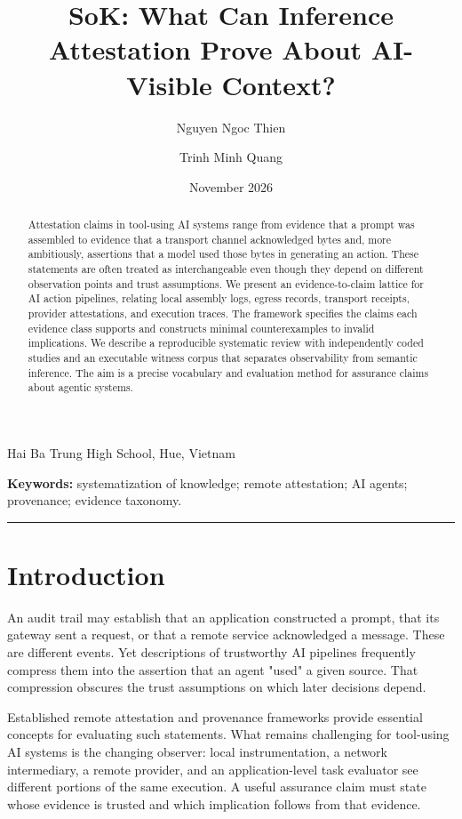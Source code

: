 \documentclass[11pt,a4paper]{article}
\title{\vspace{-1em}\textbf{SoK: What Can Inference Attestation Prove About AI-Visible Context?}}
\author{Nguyen Ngoc Thien \and Trinh Minh Quang}\date{November 2026}
\begin{document}
\maketitle
\begin{center}\small Hai Ba Trung High School, Hue, Vietnam\end{center}
\begin{abstract}
Attestation claims in tool-using AI systems range from evidence that a prompt was assembled to evidence that a transport channel acknowledged bytes and, more ambitiously, assertions that a model used those bytes in generating an action. These statements are often treated as interchangeable even though they depend on different observation points and trust assumptions. We present an evidence-to-claim lattice for AI action pipelines, relating local assembly logs, egress records, transport receipts, provider attestations, and execution traces. The framework specifies the claims each evidence class supports and constructs minimal counterexamples to invalid implications. We describe a reproducible systematic review with independently coded studies and an executable witness corpus that separates observability from semantic inference. The aim is a precise vocabulary and evaluation method for assurance claims about agentic systems.
\end{abstract}
\noindent\textbf{Keywords:} systematization of knowledge; remote attestation; AI agents; provenance; evidence taxonomy.
\medskip\hrule\medskip

\section{Introduction}
An audit trail may establish that an application constructed a prompt, that its gateway sent a request, or that a remote service acknowledged a message. These are different events. Yet descriptions of trustworthy AI pipelines frequently compress them into the assertion that an agent "used" a given source. That compression obscures the trust assumptions on which later decisions depend.

Established remote attestation and provenance frameworks provide essential concepts for evaluating such statements. What remains challenging for tool-using AI systems is the changing observer: local instrumentation, a network intermediary, a remote provider, and an application-level task evaluator see different portions of the same execution. A useful assurance claim must state whose evidence is trusted and which implication follows from that evidence.
\end{document}
